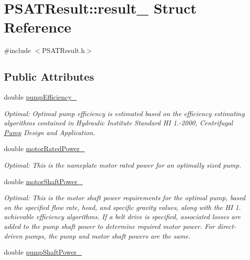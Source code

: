 \hypertarget{struct_p_s_a_t_result_1_1result__}{}\section{P\+S\+A\+T\+Result\+:\+:result\+\_\+ Struct Reference}
\label{struct_p_s_a_t_result_1_1result__}


{\ttfamily \#include $<$P\+S\+A\+T\+Result.\+h$>$}

\subsection*{Public Attributes}
\begin{DoxyCompactItemize}
\item 
double \hyperlink{struct_p_s_a_t_result_1_1result___a0065022cdb7678fd08ac63d80de08f85}{pump\+Efficiency\+\_\+}
\begin{DoxyCompactList}\small\item\em Optimal\+: Optimal pump efficiency is estimated based on the efficiency estimating algorithms contained in Hydraulic Institute Standard HI 1.-\/2000, Centrifugal \hyperlink{class_pump}{Pump} Design and Application. \end{DoxyCompactList}\item 
double \hyperlink{struct_p_s_a_t_result_1_1result___a7debf54d8680536c141a64d758fa5e4b}{motor\+Rated\+Power\+\_\+}
\begin{DoxyCompactList}\small\item\em Optimal\+: This is the nameplate motor rated power for an optimally sized pump. \end{DoxyCompactList}\item 
double \hyperlink{struct_p_s_a_t_result_1_1result___a323a0097e50cc796e105803f435f3f88}{motor\+Shaft\+Power\+\_\+}
\begin{DoxyCompactList}\small\item\em Optimal\+: This is the motor shaft power requirements for the optimal pump, based on the specified flow rate, head, and specific gravity values, along with the HI 1. achievable efficiency algorithms. If a belt drive is specified, associated losses are added to the pump shaft power to determine required motor power. For direct-\/driven pumps, the pump and motor shaft powers are the same. \end{DoxyCompactList}\item 
double \hyperlink{struct_p_s_a_t_result_1_1result___a825e4641aa3bac34b72a9494a3d623e3}{pump\+Shaft\+Power\+\_\+}

\end{DoxyCompactItemize}
